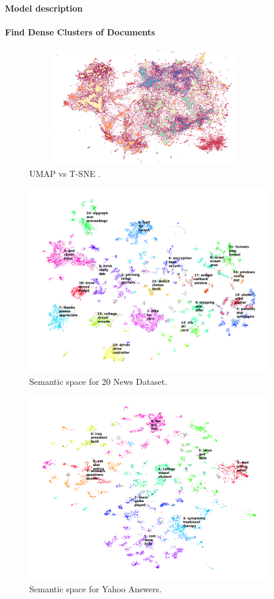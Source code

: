 \begin{frame}[fragile=singleslide]{\large \textbf{Model description}}
  \framesubtitle{Find Dense Clusters of Documents}
  \begin{figure}[ht!]
    \includegraphics[width=10cm,height=5cm]{Graphics/hdbscan_docs.png}
    \caption{UMAP vs T-SNE \cite{Angelov_2020}.}
  \end{figure}
\end{frame}

\begin{frame}[fragile=singleslide]{}
  \begin{figure}[ht!]
    \includegraphics[height=8cm]{Graphics/news_clustered.png}
    \caption{Semantic space for 20 News Dataset.}
  \end{figure}
\end{frame}

\begin{frame}[fragile=singleslide]{}
  \begin{figure}[ht!]
    \includegraphics[height=8cm]{Graphics/yahoo_clustered.png}
    \caption{Semantic space for Yahoo Answers.}
  \end{figure}
\end{frame}

